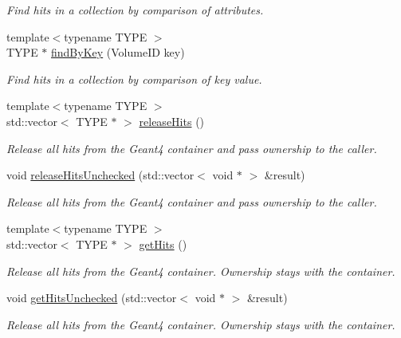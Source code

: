 \begin{DoxyCompactItemize}
\begin{DoxyCompactList}\small\item\em Find hits in a collection by comparison of attributes. \item\end{DoxyCompactList}\item 
{\footnotesize template$<$typename TYPE $>$ }\\TYPE $\ast$ \hyperlink{class_d_d4hep_1_1_simulation_1_1_geant4_hit_collection_acc76f5d25e9936860343b5457829426c}{findByKey} (VolumeID key)
\begin{DoxyCompactList}\small\item\em Find hits in a collection by comparison of key value. \item\end{DoxyCompactList}\item 
{\footnotesize template$<$typename TYPE $>$ }\\std::vector$<$ TYPE $\ast$ $>$ \hyperlink{class_d_d4hep_1_1_simulation_1_1_geant4_hit_collection_a956b41eb42d71e0270e266d4776ee778}{releaseHits} ()
\begin{DoxyCompactList}\small\item\em Release all hits from the Geant4 container and pass ownership to the caller. \item\end{DoxyCompactList}\item 
void \hyperlink{class_d_d4hep_1_1_simulation_1_1_geant4_hit_collection_a38a222d3123281d7bb8f19f98027ec0b}{releaseHitsUnchecked} (std::vector$<$ void $\ast$ $>$ \&result)
\begin{DoxyCompactList}\small\item\em Release all hits from the Geant4 container and pass ownership to the caller. \item\end{DoxyCompactList}\item 
{\footnotesize template$<$typename TYPE $>$ }\\std::vector$<$ TYPE $\ast$ $>$ \hyperlink{class_d_d4hep_1_1_simulation_1_1_geant4_hit_collection_a89b8d192b634abba30bcebe231dbf43d}{getHits} ()
\begin{DoxyCompactList}\small\item\em Release all hits from the Geant4 container. Ownership stays with the container. \item\end{DoxyCompactList}\item 
void \hyperlink{class_d_d4hep_1_1_simulation_1_1_geant4_hit_collection_a8faab9f1247e2d705da1c501c84197b5}{getHitsUnchecked} (std::vector$<$ void $\ast$ $>$ \&result)
\begin{DoxyCompactList}\small\item\em Release all hits from the Geant4 container. Ownership stays with the container. \item\end{DoxyCompactList}\end{DoxyCompactItemize}
